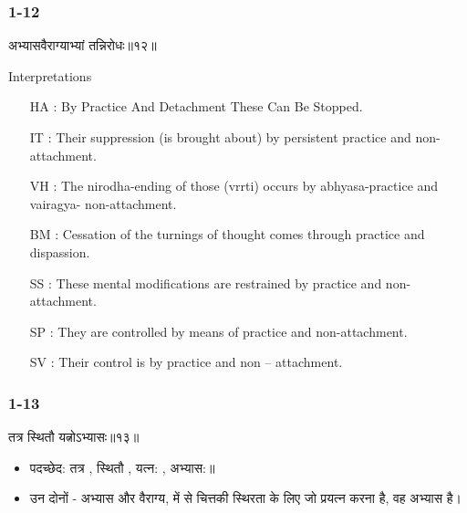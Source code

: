 \begin{frame}[fragile]\frametitle{1-12}
\begin{sanskrit}
अभ्यासवैराग्याभ्यां तन्निरोधः॥१२॥
\end{sanskrit}

Interpretations
\begin{itemize}		
\item [HA]: By Practice And Detachment These Can Be Stopped.
\item [IT]: Their suppression (is brought about) by persistent practice and non-attachment.
\item [VH]: The nirodha-ending of those (vrrti) occurs by abhyasa-practice and vairagya- non-attachment.
\item [BM]: Cessation of the turnings of thought comes through practice and dispassion.
\item [SS]: These mental modifications are restrained by practice and non-attachment.
\item [SP]: They are controlled by means of practice and non-attachment.
\item [SV]: Their control is by practice and non – attachment.
\end{itemize}
	
\end{frame}

\begin{frame}[fragile]\frametitle{1-13}
\begin{sanskrit}
तत्र स्थितौ यत्नोऽभ्यासः॥१३॥
\end{sanskrit}

\begin{itemize}
\item पदच्छेद: तत्र , स्थितौ , यत्न: , अभ्यास:॥
\item उन दोनों - अभ्यास और वैराग्य, में से चित्तकी स्थिरता के लिए जो प्रयत्न करना है, वह अभ्यास है।
\end{itemize}
	
\end{frame}


